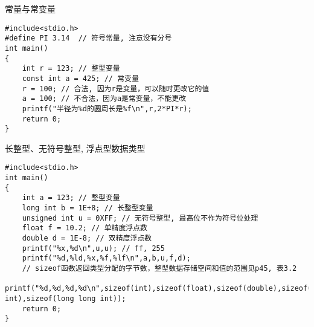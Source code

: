 \begin{frame}[fragile]{常量与常变量}
\begin{lstlisting}
#include<stdio.h> 
#define PI 3.14  // 符号常量, 注意没有分号           
int main()                   
{                            
	int r = 123; // 整型变量
	const int a = 425; // 常变量
	r = 100; // 合法, 因为r是变量，可以随时更改它的值
	a = 100; // 不合法，因为a是常变量，不能更改
	printf("半径为%d的圆周长是%f\n",r,2*PI*r); 
	return 0;           
}                            
\end{lstlisting}
\end{frame}

\begin{frame}{长整型、无符号整型, 浮点型数据类型}
\begin{lstlisting}
#include<stdio.h>           
int main()                   
{                            
	int a = 123; // 整型变量
	long int b = 1E+8; // 长整型变量
	unsigned int u = 0XFF; // 无符号整型, 最高位不作为符号位处理
	float f = 10.2; // 单精度浮点数
	double d = 1E-8; // 双精度浮点数
	printf("%x,%d\n",u,u); // ff, 255
	printf("%d,%ld,%x,%f,%lf\n",a,b,u,f,d);
	// sizeof函数返回类型分配的字节数，整型数据存储空间和值的范围见p45, 表3.2
	printf("%d,%d,%d,%d\n",sizeof(int),sizeof(float),sizeof(double),sizeof(long int),sizeof(long long int));
	return 0;           
}                            
\end{lstlisting}
\end{frame}



